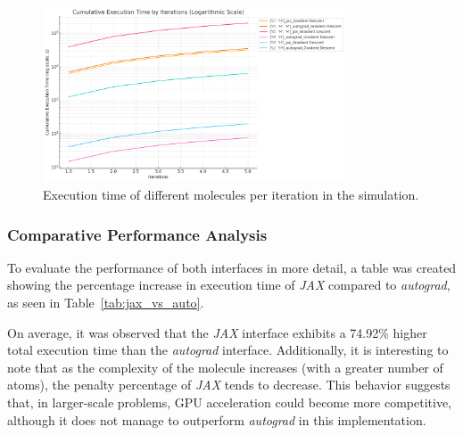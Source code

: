 \begin{figure}[H]
  \centering
  \includegraphics[width=0.8\textwidth]{img/time_iterations.png}
  \caption{Execution time of different molecules per iteration in the simulation.}
  \label{fig:time_iterations}
\end{figure}

\subsubsection{Comparative Performance Analysis}
To evaluate the performance of both interfaces in more detail, a table was created showing the percentage increase in execution time of \textit{JAX} compared to \textit{autograd}, as seen in Table~\ref{tab:jax_vs_auto}.

\begin{table}[H]
  \centering
  \scriptsize
  \caption{Comparison of execution times between JAX and autograd interfaces for different molecules.}
  \label{tab:jax_vs_auto}
\end{table}

On average, it was observed that the \textit{JAX} interface exhibits a 74.92\% higher total execution time than the \textit{autograd} interface. Additionally, it is interesting to note that as the complexity of the molecule increases (with a greater number of atoms), the penalty percentage of \textit{JAX} tends to decrease. This behavior suggests that, in larger-scale problems, GPU acceleration could become more competitive, although it does not manage to outperform \textit{autograd} in this implementation.

